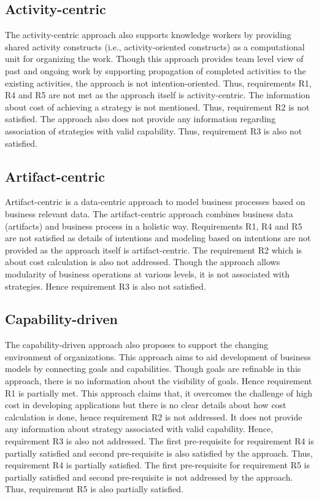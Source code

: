 \subsection{Activity-centric} 
The activity-centric approach also supports knowledge workers by providing shared activity constructs (i.e., activity-oriented constructs) as a computational unit for organizing the work. Though this approach provides team level view of past and ongoing work by supporting propagation of completed activities to the existing activities, the approach is not intention-oriented. Thus, requirements R1, R4 and R5 are not met as the approach itself is activity-centric. The information about cost of achieving a strategy is not mentioned. Thus, requirement R2 is not satisfied. The approach also does not provide any information regarding association of strategies with valid capability. Thus, requirement R3 is also not satisfied.   
 
\subsection{Artifact-centric} 
Artifact-centric is a data-centric approach to model business processes based on business relevant data. The artifact-centric approach combines business data (artifacts) and business process in a holistic way. Requirements R1, R4 and R5 are not satisfied as details of intentions and modeling based on intentions are not provided as the approach itself is artifact-centric. The requirement R2 which is about cost calculation is also not addressed. Though the approach allows modularity of business operations at various levels, it is not associated with strategies. Hence requirement R3 is also not satisfied. 

\subsection{Capability-driven} 
The capability-driven approach also proposes to support the changing environment of organizations. This approach aims to aid development of business models by connecting goals and capabilities. Though goals are refinable in this approach, there is no information about the visibility of goals. Hence requirement R1 is partially met. This approach claims that, it overcomes the challenge of high cost in developing applications but there is no clear details about how cost calculation is done, hence requirement R2 is not addressed. It does not provide any information about strategy associated with valid capability. Hence, requirement R3 is also not addressed. The first pre-requisite for requirement R4 is partially satisfied and second pre-requisite is also satisfied by the approach. Thus, requirement R4 is partially satisfied. The first pre-requisite for requirement R5 is partially satisfied and second pre-requisite is not addressed by the approach. Thus, requirement R5 is also partially satisfied. 

